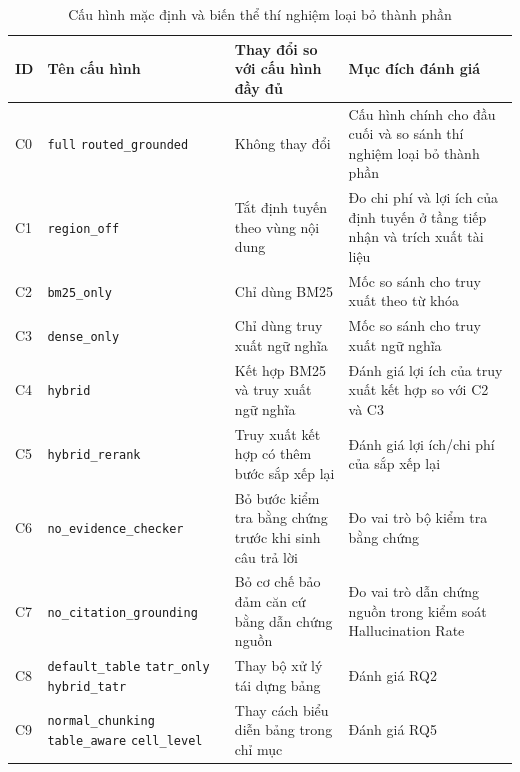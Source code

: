 \documentclass[../DoAn.tex]{subfiles}
\begin{document}
\begin{table}[H]
\centering
\caption{Cấu hình mặc định và biến thể thí nghiệm loại bỏ thành phần}
\label{tab:default-config-ablation}

\footnotesize
\begin{tabularx}{\textwidth}{|
>{\RaggedRight\arraybackslash}p{}|
>{\RaggedRight\arraybackslash}p{}|
>{\RaggedRight\arraybackslash}X|
>{\RaggedRight\arraybackslash}p{}|
}
\hline
\textbf{ID} & \textbf{Tên cấu hình} & \textbf{Thay đổi so với cấu hình đầy đủ} & \textbf{Mục đích đánh giá} \\
\hline
C0 & \texttt{full} \newline \texttt{routed\_grounded} & Không thay đổi & Cấu hình chính cho đầu cuối và so sánh thí nghiệm loại bỏ thành phần \\
\hline
C1 & \texttt{region\_off} & Tắt định tuyến theo vùng nội dung & Đo chi phí và lợi ích của định tuyến ở tầng tiếp nhận và trích xuất tài liệu \\
\hline
C2 & \texttt{bm25\_only} & Chỉ dùng BM25 & Mốc so sánh cho truy xuất theo từ khóa \\
\hline
C3 & \texttt{dense\_only} & Chỉ dùng truy xuất ngữ nghĩa & Mốc so sánh cho truy xuất ngữ nghĩa \\
\hline
C4 & \texttt{hybrid} & Kết hợp BM25 và truy xuất ngữ nghĩa & Đánh giá lợi ích của truy xuất kết hợp so với C2 và C3 \\
\hline
C5 & \texttt{hybrid\_rerank} & Truy xuất kết hợp có thêm bước sắp xếp lại & Đánh giá lợi ích/chi phí của sắp xếp lại \\
\hline
C6 & \texttt{no\_evidence\_checker} & Bỏ bước kiểm tra bằng chứng trước khi sinh câu trả lời & Đo vai trò bộ kiểm tra bằng chứng \\
\hline
C7 & \texttt{no\_citation\_grounding} & Bỏ cơ chế bảo đảm căn cứ bằng dẫn chứng nguồn & Đo vai trò dẫn chứng nguồn trong kiểm soát Hallucination Rate \\
\hline
C8 & \texttt{default\_table} \newline \texttt{tatr\_only} \newline \texttt{hybrid\_tatr} & Thay bộ xử lý tái dựng bảng & Đánh giá RQ2 \\
\hline
C9 & \texttt{normal\_chunking} \newline \texttt{table\_aware} \newline \texttt{cell\_level} & Thay cách biểu diễn bảng trong chỉ mục & Đánh giá RQ5 \\
\hline
\end{tabularx}
\end{table}
\end{document}

